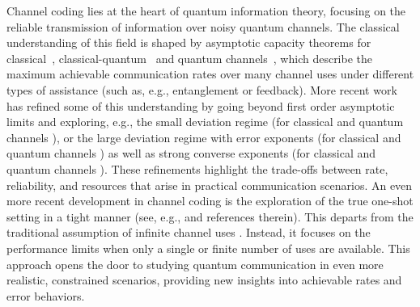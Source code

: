\documentclass[a4paper,onecolumn,11pt,accepted=2025-10-01]{quantumarticle}
\begin{document}
Channel coding lies at the heart of quantum information theory, focusing on the reliable transmission of information over noisy quantum channels. The classical understanding of this field is shaped by asymptotic capacity theorems for classical~\cite{shannon1948mathematical}, classical-quantum~\cite{Holevo1998Jan,Schumacher1997Jul} and quantum channels~\cite{Lloyd97,Shor02,Devetak05,Bennett1999Oct,Bennett2002Oct}, which describe the maximum achievable communication rates over many channel uses under different types of assistance (such as, e.g., entanglement or feedback). More recent work has refined some of this understanding by going beyond first order asymptotic limits and exploring, e.g., the small deviation regime (for classical \cite{Str62,Hayashi09,polyanskiy2010channel} and quantum channels \cite{Tomamichel2015Aug,Datta2016Jun}), or the large deviation regime with error exponents (for classical \cite{Fano1961Nov,Shannon1967Jan,Haroutunian2008Feb} and quantum channels \cite{Dalai2013Sep, Beigi2023Oct,Li2024Jul,Renes2024Jul,Oufkir24}) as well as strong converse exponents (for classical \cite{Arimoto1973May,imre} and quantum channels \cite{Winter2002Aug,Ogawa2002Aug,Gupta2015Mar,Li2023Nov}). These refinements highlight the trade-offs between rate, reliability, and resources that arise in practical communication scenarios. An even more recent development in channel coding is the exploration of the true one-shot setting in a tight manner (see, e.g., \cite{polyanskiy2010channel,Buscemi2010Mar,Wang12,Matthews2014Sep,Leung2015Jun,barman2017algorithmic,Fawzi19,Wang2019Feb,Berta2022Jul} and references therein). This departs from the traditional assumption of infinite channel uses \cite{Tomamichel2016}. Instead, it focuses on the performance limits when only a single or finite number of uses are available. This approach opens the door to studying quantum communication in even more realistic, constrained scenarios, providing new insights into achievable rates and error behaviors.
\end{document}

